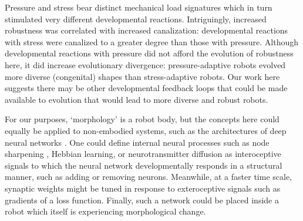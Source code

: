 Pressure and stress bear distinct mechanical load signatures which in turn stimulated very different developmental reactions.
Intriguingly, increased robustness was correlated with increased canalization: developmental reactions with stress were canalized to a greater degree than those with pressure.
Although developmental reactions with pressure did not afford the evolution of robustness here, it did increase evolutionary divergence: pressure-adaptive robots evolved more diverse 
(congenital) 
shapes than stress-adaptive robots.
Our work here suggests
there may be other developmental feedback loops that could be made available to evolution
that would lead to more diverse and robust robots.


For our purposes,  `morphology' is a robot body,
but the concepts here could equally be applied to non-embodied systems, such as the architectures of deep 
neural networks \citep{miikkulainen2017evolving,zoph2016neural}.
One could define 
internal neural processes such as node sharpening \cite{french1994dynamically},
Hebbian learning,
or neurotransmitter diffusion \cite{husbands1998better, velez2017diffusion}
as interoceptive signals to which
the neural network developmentally responds in a structural manner,
such as adding or removing neurons.
Meanwhile, at a faster time scale, synaptic weights might be tuned in response to 
exteroceptive signals such as gradients of a loss function.
Finally, such a network could be placed inside a robot
which itself is experiencing morphological change.







